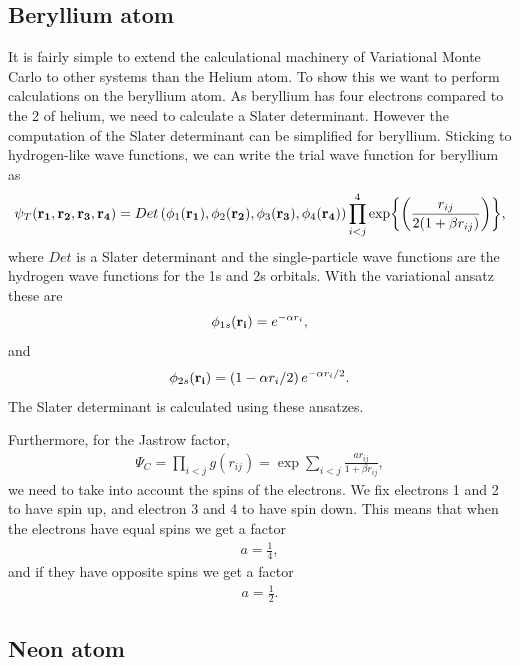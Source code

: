 \documentclass[11pt]{article}
\begin{document}
	\subsection{Beryllium atom}

		It is fairly simple to extend the calculational machinery of Variational
		Monte Carlo to other systems than the Helium atom. To show this we
		want to perform calculations on the beryllium atom. As beryllium has
		four electrons compared to the 2 of helium, we need to calculate a
		Slater determinant. However the computation of the Slater determinant
		can be simplified for beryllium. Sticking to hydrogen-like wave functions,
		we can write the trial wave function for beryllium as
		\begin{equation}
			\psi_{T}({\bf r_{1}},{\bf r_{2}},{\bf r_{3}},{\bf r_{4}})=Det\left(\phi_{1}({\bf r_{1}}),\phi_{2}({\bf r_{2}}),\phi_{3}({\bf r_{3}}),\phi_{4}({\bf r_{4}})\right)\prod_{i<j}^{4}\exp{\left(\frac{r_{ij}}{2(1+\beta r_{ij})}\right)},
			\label{eq:BerylliumTrialFunction}
		\end{equation}
		where $Det$ is a Slater determinant and the single-particle wave
		functions are the hydrogen wave functions for the 1s and 2s orbitals.
		With the variational ansatz these are
		\begin{align}
			\phi_{1s}({\bf r_{i}})=e^{-\alpha r_{i}},
		\end{align}
		and
		\begin{align}
			\phi_{2s}({\bf r_{i}})=\left(1-\alpha r_{i}/2\right)e^{-\alpha r_{i}/2}.
		\end{align}
		The Slater determinant is calculated using these ansatzes.

		Furthermore, for the Jastrow factor,
		\begin{align}
			\Psi_{C}=\prod_{i<j}g(r_{ij})=\exp{\sum_{i<j}\frac{ar_{ij}}{1+\beta r_{ij}}},
		\end{align}
		we need to take into account the spins of the electrons. We fix electrons
		1 and 2 to have spin up, and electron 3 and 4 to have spin down. This
		means that when the electrons have equal spins we get a factor
		\begin{align}
			a=\frac{1}{4},
		\end{align}
		and if they have opposite spins we get a factor
		\begin{align}
			a=\frac{1}{2}.
		\end{align}

	\subsection{Neon atom}
\end{document}
